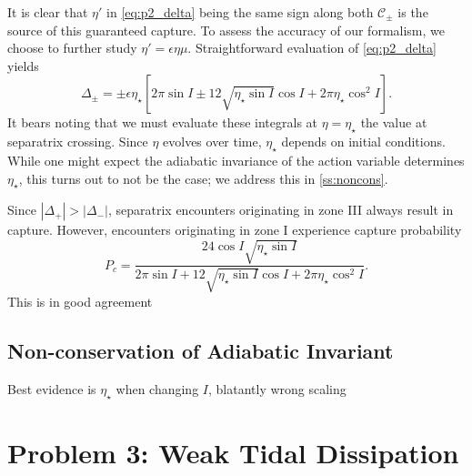 \documentclass[
        fleqn,
        usenatbib,
    ]{mnras}
\newcommand*{\abs}[1]{\left|#1\right|}
\newcommand*{\s}[1]{\left[#1\right]}
\begin{document}
It is clear that $\eta'$ in \autoref{eq:p2_delta} being the same sign along both
$\mathcal{C}_{\pm}$ is the source of this guaranteed capture. To assess the
accuracy of our formalism, we choose to further study $\eta' = \epsilon \eta
\mu$. Straightforward evaluation of \autoref{eq:p2_delta} yields
\begin{equation}
    \Delta_{\pm} = \pm \epsilon \eta_\star \s{
        2\pi \sin I \pm 12 \sqrt{\eta_\star \sin I}\cos I
            + 2\pi \eta_\star \cos^2 I}.
\end{equation}
It bears noting that we must evaluate these integrals at $\eta = \eta_\star$ the
value at separatrix crossing. Since $\eta$ evolves over time, $\eta_{\star}$
depends on initial conditions. While one might expect the adiabatic invariance
of the action variable determines $\eta_\star$, this turns out to not be the
case; we address this in \autoref{ss:noncons}.

Since $\abs{\Delta_+} > \abs{\Delta_-}$, separatrix encounters originating in
zone III always result in capture. However, encounters originating in zone I
experience capture probability
\begin{equation}
    P_c = \frac{24\cos I \sqrt{\eta_\star \sin I}}{
        2\pi \sin I + 12\sqrt{\eta_\star \sin I}\cos I
            + 2\pi \eta_\star \cos^2 I}.
\end{equation}
This is in good agreement

\subsection{Non-conservation of Adiabatic Invariant}\label{ss:noncons}

Best evidence is $\eta_{\star}$ when changing $I$, blatantly wrong scaling

\section{Problem 3: Weak Tidal Dissipation}\label{s:p3}






\label{lastpage} %
\end{document}
